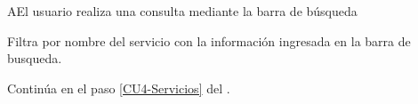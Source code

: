 		\begin{UCtrayectoriaA}{A}{El usuario realiza una consulta mediante la barra de búsqueda}
			
		\UCpaso Filtra por nombre del servicio con la información ingresada en la barra de busqueda.
		
		\UCpaso Continúa en el paso \ref{CU4-Servicios} del .
		
	\end{UCtrayectoriaA}
	
	